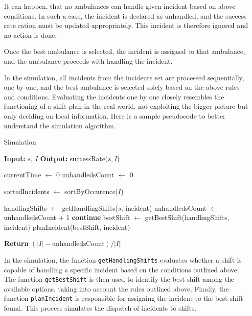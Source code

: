 It can happen, that no ambulances can handle given incident based on above
conditions. In such a case, the incident is declared as unhandled, and the
success rate ration must be updated appropriately. This incident is therefore
ignored and no action is done.

Once the best ambulance is selected, the incident is assigned to that
ambulance, and the ambulance proceeds with handling the incident.

In the simulation, all incidents from the incidents set are processed
sequentially, one by one, and the best ambulance is selected solely based on
the above rules and conditions. Evaluating the incidents one by one closely
resembles the functioning of a shift plan in the real world, not exploiting the
bigger picture but only deciding on local information. Here is a sample
pseudocode to better understand the simulation algorithm.

\begin{algorithm}
    \caption{Simulation}
    \label{alg:Simulation}
    \begin{algorithmic}[1]
        \STATE \textbf{Input:} $s$, $I$
        \STATE \textbf{Output:} successRate($s, I$)

        \STATE currentTime $\leftarrow$ 0
        \STATE unhandledsCount $\leftarrow$ 0

        \STATE sortedIncidents $\leftarrow$ sortByOccurence($I$)

        \STATE handlingShifts $\leftarrow$ getHandlingShifts($s$, incident)
        \label{func:getHandlingShifts}
        \STATE unhandledsCount $\leftarrow$ unhandledsCount + 1
        \STATE \textbf{continue}
        \ENDIF
        \STATE bestShift $\leftarrow$ getBestShift(handlingShifts, incident)
        \STATE planIncident(bestShift, incident)
        \ENDFOR

        \STATE \textbf{Return} $(|I| - \text{unhandledsCount}) / |I|$
    \end{algorithmic}
\end{algorithm}

In the simulation, the function \texttt{getHandlingShifts} evaluates whether a
shift is capable of handling a specific incident based on the conditions
outlined above. The function \texttt{getBestShift} is then used to identify the
best shift among the available options, taking into account the rules outlined
above. Finally, the function \texttt{planIncident} is responsible for assigning
the incident to the best shift found. This process simulates the dispatch of
incidents to shifts.

